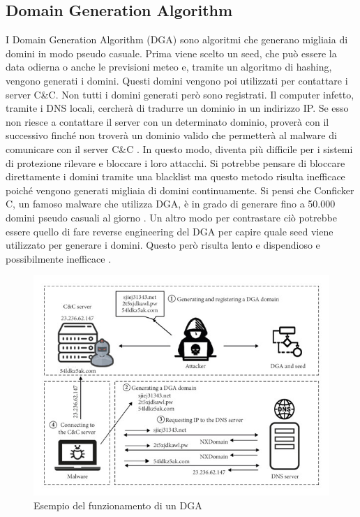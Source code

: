 \documentclass[12pt,a4paper,openright,twoside]{book}
\begin{document}
\subsection{Domain Generation Algorithm}

I Domain Generation Algorithm (DGA) sono algoritmi che generano migliaia di domini in modo pseudo casuale.
Prima viene scelto un seed, che può essere la data odierna
o anche le previsioni meteo \cite{8621875} e, tramite
un algoritmo di hashing, vengono generati i domini.
Questi domini vengono poi utilizzati per contattare i server C\&C.
Non tutti i domini generati però sono registrati.
Il computer infetto, tramite i DNS locali, cercherà di tradurre
un dominio in un indirizzo IP.
Se esso non riesce a contattare il server con un determinato dominio,
proverà con il successivo finché non troverà
un dominio valido che permetterà al malware di comunicare con
il server C\&C \cite{8489147}.
In questo modo, diventa più difficile per i sistemi di protezione
rilevare e bloccare i loro attacchi.
Si potrebbe pensare di bloccare direttamente i domini tramite
una blacklist ma questo metodo
risulta inefficace poiché vengono generati migliaia di domini
continuamente. Si pensi che Conficker C, un famoso malware
che utilizza DGA, è in grado di generare
fino a 50.000 domini pseudo casuali al giorno \cite{978131}.
Un altro modo per contrastare ciò
potrebbe essere quello di fare reverse engineering
del DGA per capire quale seed viene utilizzato per generare i domini.
Questo però risulta lento e dispendioso e possibilmente inefficace \cite{8887881}.

\begin{figure}[H]
    \centering
    \includegraphics[width=.8\linewidth]{figures/DGA example.jpg}
    \caption{Esempio del funzionamento di un DGA \cite{8887881}}
    \label{fig:DGA example}
\end{figure}
\end{document}
